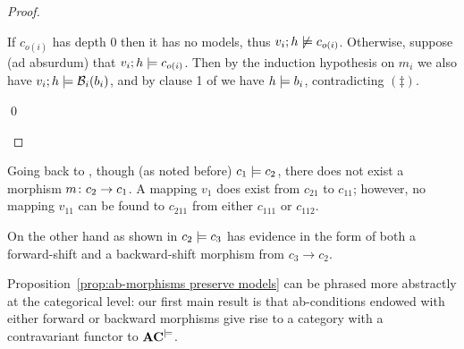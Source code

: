 \begin{fullorname}
\begin{proof}
\begin{enumerate}
If $c_{o(i)}$ has depth 0 then it has no models, thus $v_i ;h \not \models c_{o(i)}$.
 Otherwise, suppose (ad absurdum) that $v_i ;h \models c_{o(i)}$. Then by the induction hypothesis on $m_i$ we also have $v_i ;h \models \mathcal{B}_i(b_i)$, and by clause 1 of  we  have $h \models b_i$, contradicting $(\ddagger)$.


\qed
\end{enumerate}
\end{proof}
\end{fullorname}

\begin{example}
Going back to , though (as noted before) $c_1\models c_2$, there does not exist a morphism $m\colon c_2\rightarrow c_1$. A mapping $v_1$ does exist from $c_{21}$ to $c_{11}$; however, no mapping $v_{11}$ can be found to $c_{211}$ from either $c_{111}$ or $c_{112}$. 

On the other hand as shown in 
$c_2\models c_3$ has evidence in the form of both a forward-shift and a backward-shift morphism from $c_3\to c_2$. 
\end{example}
%
Proposition~\ref{prop:ab-morphisms preserve models} can be phrased more abstractly at the categorical level: our first main result is that ab-conditions endowed with either forward or backward morphisms give rise to a category with a contravariant functor to $\mathbf{AC}^{\models}$.

